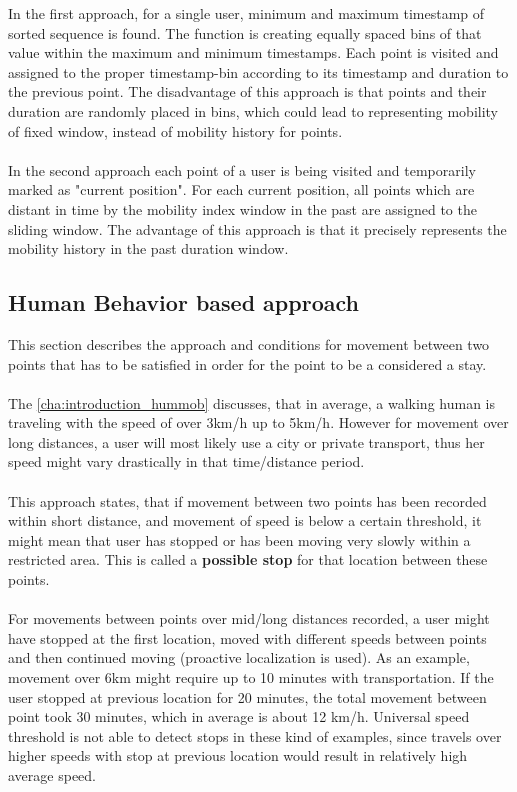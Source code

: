 In the first approach, for a single user, minimum and maximum timestamp of sorted sequence is found. The function is creating equally spaced bins of that value within the maximum and minimum timestamps. Each point is visited and assigned to the proper timestamp-bin according to its timestamp and duration to the previous point. 
The disadvantage of this approach is that points and their duration are randomly placed in bins, which could lead to representing mobility of fixed window, instead of mobility history for points.  
\\\\
In the second approach each point of a user is being visited and temporarily marked as "current position". For each current position, all points which are distant in time by the mobility index window in the past are assigned to the sliding window. The advantage of this approach is that it precisely represents the mobility history in the past duration window.

\subsection{Human Behavior based approach}
\label{cha:stopdet_bh}

This section describes the approach and conditions for movement between two points that has to be satisfied in order for the point to be a considered a stay. 
\\\\
The \autoref{cha:introduction_hummob} discusses, that in average, a walking human is traveling with the speed of over 3km/h up to 5km/h. However for movement over long distances, a user will most likely use a city or private transport, thus her speed might vary drastically in that time/distance period.
\\\\
This approach states, that if movement between two points has been recorded within short distance, and movement of speed is below a certain threshold, it might mean that user has stopped or has been moving very slowly within a restricted area. This is called a \textbf{possible stop} for that location between these points. 
\\\\
For movements between points over mid/long distances recorded, a user might have stopped at the first location, moved with different speeds between points and then continued moving (proactive localization is used). As an example, movement over 6km might require up to 10 minutes with transportation. If the user stopped at previous location for 20 minutes, the total movement between point took 30 minutes, which in average is about 12 km/h. Universal speed threshold is not able to detect stops in these kind of examples, since travels over higher speeds with stop at previous location would result in relatively high average speed. 

